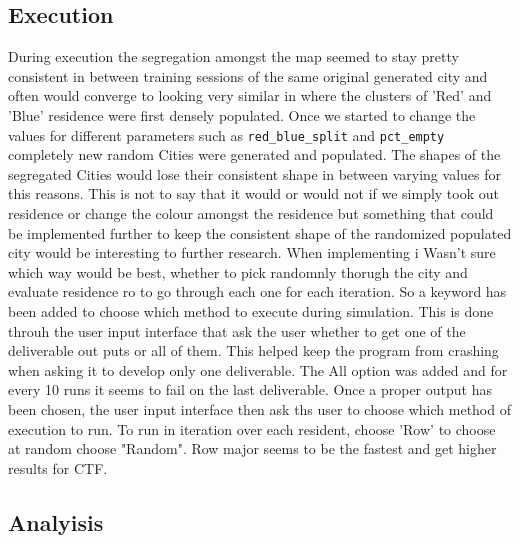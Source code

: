\documentclass[letterpaper]{article}
\begin{document}
\subsection{Execution}

During execution the segregation amongst the map seemed to stay pretty consistent in between training sessions of the same original generated city and often would converge to looking very similar in where the clusters of 'Red' and 'Blue' residence were first densely populated.  Once we started to change the values for different parameters such as \texttt{red\_blue\_split} and \texttt{pct\_empty} completely new random Cities were generated and populated. The shapes of the segregated Cities would lose their consistent shape in between varying values for this reasons.  This is not to say that it would or would not if we simply took out residence or change the colour amongst the residence but something that could be implemented further to keep the consistent shape of the randomized populated city would be interesting to further research.  When implementing i Wasn't sure which way would be best, whether to pick randomnly thorugh the city and evaluate residence ro to go through each one for each iteration.  So a keyword has been added to choose which method to execute during simulation.  This is done throuh the user input interface that ask the user whether to get one of the deliverable out puts or all of them.  This helped keep the program from crashing when asking it to develop only one deliverable.  The All option was added and for every 10 runs it seems to fail on the last deliverable.  Once a proper output has been chosen, the user input interface then ask ths user to choose which method of execution to run.   To run in iteration over each resident, choose 'Row' to choose at random choose "Random".  Row major seems to be the fastest and get higher results for CTF.

\subsection{Analyisis}
\end{document}
